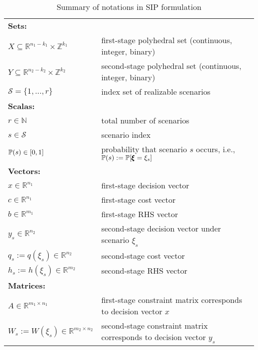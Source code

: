 \begin{table}[]
	\resizebox{\textwidth}{!}
	{
		\begin{threeparttable}
			\caption{Summary of notations in SIP formulation}
			\label{notation:SIP}
			\begin{tabular}{ll}
				\toprule
				\multicolumn{2}{l}{\textbf{Sets:}} \\ 
				$X\subseteq\mathbb{R}^{n_1-k_1}\times\mathbb{Z}^{k_1}$	& first-stage polyhedral set (continuous, integer, binary)\\
				$Y\subseteq\mathbb{R}^{n_2-k_2}\times\mathbb{Z}^{k_2}$	& second-stage polyhedral set (continuous, integer, binary)\\ 
				$\mathcal{S}=\{1,\ldots,r\}$	& index set of realizable scenarios \\ \midrule
				\multicolumn{2}{l}{\textbf{Scalas:}} \\ 
				$r\in\mathbb{N}$	& total number of scenarios	\\	
				$s\in\mathcal{S}$	& scenario index 	\\
				$\operatorname*{\mathbb{P}}(s)\in[0,1]$ & probability that scenario $s$ occurs, i.e., $\operatorname*{\mathbb{P}}(s):=\operatorname*{\mathbb{P}}[\pmb{\xi}=\xi_s]$ \\ \midrule
				\multicolumn{2}{l}{\textbf{Vectors:}} \\  
				$x\in\mathbb{R}^{n_1}$	& first-stage decision vector	\\
				$c\in \mathbb{R}^{n_1}$	& first-stage cost vector\\
				$b\in\mathbb{R}^{m_1}$	& first-stage RHS vector\\
				$y_s\in\mathbb{R}^{n_2}$	& second-stage decision vector under scenario $\xi_s$	\\
				$q_s:= q(\xi_s)\in\mathbb{R}^{n_2}$	& second-stage cost vector \\
				$h_s:= h(\xi_s)\in\mathbb{R}^{m_2}$	& second-stage RHS vector\\ \midrule
				\multicolumn{2}{l}{\textbf{Matrices:}} \\  
				$A\in\mathbb{R}^{m_1\times n_1}$	& first-stage constraint matrix corresponds to decision vector $x$\\
				$W_s:= W(\xi_s)\in\mathbb{R}^{m_2\times n_2}$	& second-stage constraint matrix corresponds to decision vector $y_s$\\

\end{tabular}
\end{threeparttable}}
\end{table}
